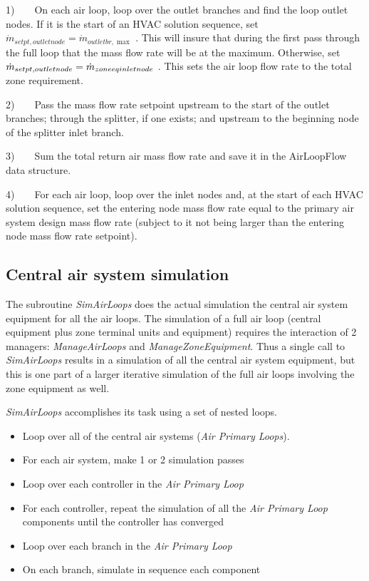 1)~~~~On each air loop, loop over the outlet branches and find the loop outlet nodes. If it is the start of an HVAC solution sequence, set \({\dot m_{setpt,outletnode}} = {\dot m_{outletbr,\max }}\) . This will insure that during the first pass through the full loop that the mass flow rate will be at the maximum. Otherwise, set \({\dot m_{setpt,outletnode}} = {\dot m_{zone{\rm{ }}eq{\rm{ }}inletnode}}\) . This sets the air loop flow rate to the total zone requirement.

2)~~~~Pass the mass flow rate setpoint upstream to the start of the outlet branches; through the splitter, if one exists; and upstream to the beginning node of the splitter inlet branch.

3)~~~~Sum the total return air mass flow rate and save it in the AirLoopFlow data structure.

4)~~~~For each air loop, loop over the inlet nodes and, at the start of each HVAC solution sequence, set the entering node mass flow rate equal to the primary air system design mass flow rate (subject to it not being larger than the entering node mass flow rate setpoint).

\subsection{Central air system simulation}\label{central-air-system-simulation}

The subroutine \emph{SimAirLoops} does the actual simulation the central air system equipment for all the air loops. The simulation of a full air loop (central equipment plus zone terminal units and equipment) requires the interaction of 2 managers: \emph{ManageAirLoops} and \emph{ManageZoneEquipment}. Thus a single call to \emph{SimAirLoops} results in a simulation of all the central air system equipment, but this is one part of a larger iterative simulation of the full air loops involving the zone equipment as well.

\emph{SimAirLoops} accomplishes its task using a set of nested loops.

\begin{itemize}
\item
  Loop over all of the central air systems (\emph{Air Primary Loops}).
\item
  For each air system, make 1 or 2 simulation passes
\item
  Loop over each controller in the \emph{Air Primary Loop}
\item
  For each controller, repeat the simulation of all the \emph{Air Primary Loop} components until the controller has converged
\item
  Loop over each branch in the \emph{Air Primary Loop}
\item
  On each branch, simulate in sequence each component
\end{itemize}

